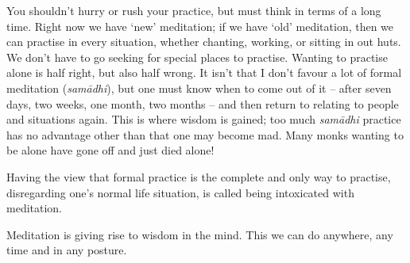 You shouldn't hurry or rush your practice, but must think in terms of a
long time. Right now we have `new' meditation; if we have `old'
meditation, then we can practise in every situation, whether chanting, 
working, or sitting in out huts. We don't have to go seeking for special
places to practise. Wanting to practise alone is half right, but also
half wrong. It isn't that I don't favour a lot of formal meditation
 (\emph{samādhi}), but one must know when to come out of it -- after
seven days, two weeks, one month, two months -- and then return to
relating to people and situations again. This is where wisdom is gained; 
too much \emph{samādhi} practice has no advantage other than that one
may become mad. Many monks wanting to be alone have gone off and just
died alone! 

Having the view that formal practice is the complete and only way to
practise, disregarding one's normal life situation, is called being
intoxicated with meditation. 

Meditation is giving rise to wisdom in the mind. This we can do
anywhere, any time and in any posture. 

